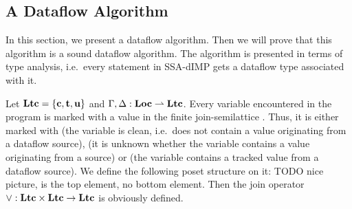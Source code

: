 \subsection{A Dataflow Algorithm}
In this section, we present a dataflow algorithm.
Then we will prove that this algorithm is a sound dataflow algorithm.
The algorithm is presented in terms of type analysis, i.e.\ every statement in 
SSA-dIMP gets a dataflow type associated with it.

Let $\textbf{Ltc} = \{\textbf{c}, \textbf{t}, \textbf{u}\}$ and
$\Gamma, \Delta: \textbf{Loc} \rightharpoonup \textbf{Ltc}$.
Every variable encountered in the program is marked with a value in the finite join-semilattice
\lattice.
Thus, it is either marked with \lclean (the variable
is clean, i.e.\ does not contain a value originating from a dataflow source), \lunknown
(it is unknown whether the variable contains a value originating from a source) or \ltracked
(the variable contains a tracked value from a dataflow source).
We define the following poset structure on it:
TODO nice picture, \lunknown is the top element, no bottom element.
Then the join operator $\lor: \textbf{Ltc} \times \textbf{Ltc} \to \textbf{Ltc}$ is 
obviously defined.

